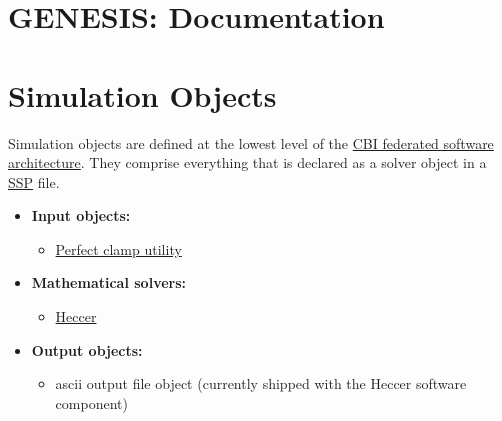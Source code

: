 \documentclass[12pt]{article}
\begin{document}
\section*{GENESIS: Documentation}

\section*{Simulation Objects}

Simulation objects are defined at the lowest level of the \href{../genesis-overview/genessis-overview.tex}{CBI federated software architecture}. They comprise everything that is declared as a solver object in a \href{../ssp/ssp.tex}{SSP} file.

\begin{itemize}

\item {\bf Input objects:}
   \begin{itemize}
      \item \href{../pclamp/pclamp.tex}{Perfect clamp utility}
   \end{itemize}
   
\item{\bf Mathematical solvers:}
   \begin{itemize}
      \item \href{../heccer/heccer.tex}{Heccer}
   \end{itemize}
   
\item {\bf Output objects:}
   \begin{itemize}
      \item ascii output file object (currently shipped with the Heccer software component)
   \end{itemize}

\end{itemize}
\end{document}
